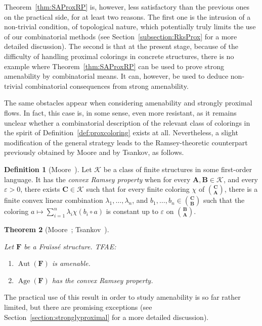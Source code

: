 \documentclass[11pt]{article}
\newtheorem{theo}{Theorem}[section]
\theoremstyle{definition}
\newtheorem{defi}[theo]{Definition}
\numberwithin{equation}{section}
\numberwithin{figure}{section}
\numberwithin{table}{section}
\newcommand{\K}{\mathcal{K}}
\newcommand*{\mA}{\mathbf{A}}
\newcommand*{\mB}{\mathbf{B}}
\newcommand*{\mC}{\mathbf{C}}
\newcommand*{\mF}{\mathbf{F}}
\newcommand{\e}{\varepsilon}
\DeclareMathOperator{\Aut}{Aut}
\DeclareMathOperator{\Age}{Age}
\begin{document}
Theorem~\ref{thm:SAProxRP} is, however, less satisfactory than the previous ones on the practical side, for at least two reasons. The first one is the intrusion of a non-trivial condition, of topological nature, which potentially truly limits the use of our combinatorial methods (see Section~\ref{subsection:RksProx} for a more detailed discussion). The second is that at the present stage, because of the difficulty of handling proximal colorings in concrete structures, there is no example where Theorem~\ref{thm:SAProxRP} can be used to prove strong amenability by combinatorial means. It can, however, be used to deduce non-trivial combinatorial consequences from strong amenability.

The same obstacles appear when considering amenability and strongly proximal flows. In fact, this case is, in some sense, even more resistant, as it remains unclear whether a combinatorial description of the relevant class of colorings in the spirit of Definition~\ref{def:proxcoloring} exists at all. Nevertheless, a slight modification of the general strategy leads to the Ramsey-theoretic counterpart previously obtained by Moore and by Tsankov, as follows.

\begin{defi}[Moore~\cite{M}]

Let $\K$ be a class of finite structures in some first-order language. It has the \emph{convex Ramsey property} when for every $\mA, \mB \in \K$, and every $\e>0$, there exists $\mC\in \K$ such that for every finite coloring $\chi$ of $\binom{\mC}{\mA}$, there is a finite convex linear combination $\lambda_{1},\ldots,\lambda_{n}$, and $b_{1},\ldots,b_{n}\in \binom{\mC}{\mB}$ such that the coloring $a\mapsto \sum_{i=1}^{n}\lambda_{i}\chi(b_{i}\circ a)$ is constant up to $\e$ on $\binom{\mB}{\mA}$.
\end{defi}

\begin{theo}[Moore~\cite{M}; Tsankov~\cite{Ts1}]
\label{thm:AConvexRP}

Let $\mF$ be a Fra\"{\i}ss\'e structure. TFAE:
\begin{enumerate}
\item $\Aut(\mF)$ is amenable.
\item $\Age(\mF)$ has the convex Ramsey property.
\end{enumerate}
\end{theo}

The practical use of this result in order to study amenability is so far rather limited, but there are promising exceptions (see Section~\ref{section:stronglyproximal} for a more detailed discussion).
\end{document}
